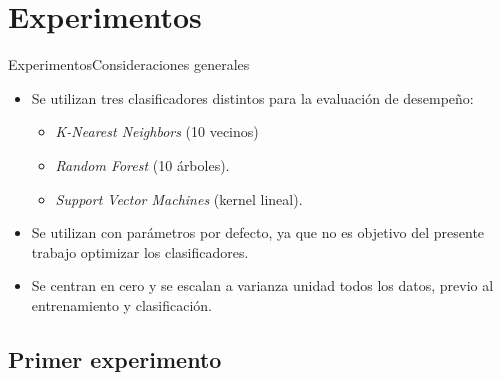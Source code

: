 \documentclass[aspectratio=169]{beamer}
\begin{document}
\section{Experimentos}

\begin{frame}{Experimentos}{Consideraciones generales}
  \begin{itemize}
  \item {
    Se utilizan tres clasificadores distintos para la evaluación de desempeño:
    \begin{itemize}
    	\item \textit{K-Nearest Neighbors} (10 vecinos)
     	\item \textit{Random Forest} (10 árboles).
     	\item \textit{Support Vector Machines} (kernel lineal).
    \end{itemize}}
  \item {   
    Se utilizan con parámetros por defecto, ya que no es objetivo del presente trabajo optimizar los clasificadores.
  }
	\item{Se centran en cero y se escalan a varianza unidad todos los datos, previo al entrenamiento y clasificación.
	}
  \end{itemize}
\end{frame}

\subsection{Primer experimento}
\end{document}
